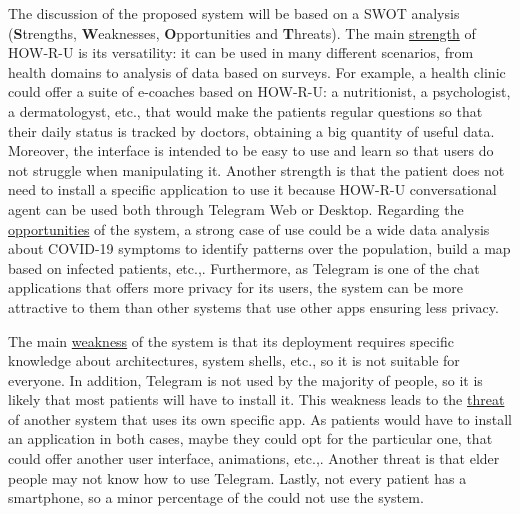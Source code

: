 \documentclass[12pt,english]{article}
\begin{document}
The discussion of the proposed system will be based on a SWOT analysis (\textbf{S}trengths, \textbf{W}eaknesses, \textbf{O}pportunities and \textbf{T}hreats). The main \underline{strength} of HOW-R-U is its versatility: it can be used in many different scenarios, from health domains to analysis of data based on surveys. For example, a health clinic could offer a suite of e-coaches based on HOW-R-U: a nutritionist, a psychologist, a dermatologyst, etc., that would make the patients regular questions so that their daily status is tracked by doctors, obtaining a big quantity of useful data.  Moreover, the interface is intended to be easy to use and learn so that users do not struggle when manipulating it. Another strength is that the patient does not need to install a specific application to use it because HOW-R-U conversational agent can be used both through Telegram Web or Desktop. Regarding the \underline{opportunities} of the system, a strong case of use could be a wide data analysis about COVID-19 symptoms to identify patterns over the population, build a map based on infected patients, etc.,. Furthermore, as Telegram is one of the chat applications that offers more privacy for its users, the system can be more attractive to them than other systems that use other apps ensuring less privacy.


The main \underline{weakness} of the system is that its deployment requires specific knowledge about architectures, system shells, etc., so it is not suitable for everyone. In addition,  Telegram is not used by the majority of people, so it is likely that most patients will have to install it. This weakness leads to the  \underline{threat} of another system that uses its own specific app. As patients would have to install an application in both cases, maybe they could opt for the particular one, that could offer another user interface, animations, etc.,. Another threat is that elder people may not know how to use Telegram. Lastly, not every patient has a smartphone, so a minor percentage of the could not use the system.
\end{document}
